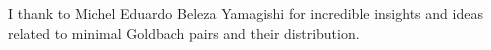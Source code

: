 ﻿I thank to Michel Eduardo Beleza Yamagishi for incredible insights and ideas related to minimal Goldbach pairs
and their distribution.
